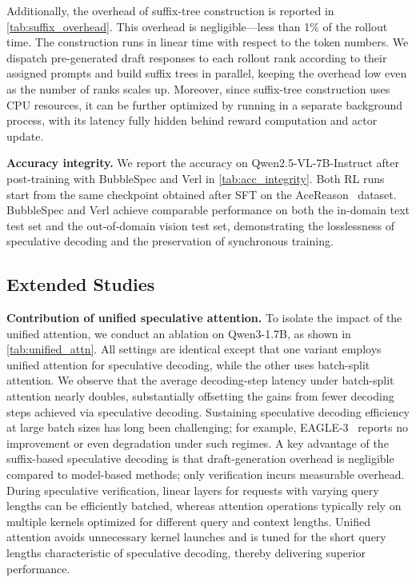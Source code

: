 Additionally, the overhead of suffix-tree construction is reported in \autoref{tab:suffix_overhead}. This overhead is negligible—less than 1\% of the rollout time. The construction runs in linear time with respect to the token numbers. We dispatch pre-generated draft responses to each rollout rank according to their assigned prompts and build suffix trees in parallel, keeping the overhead low even as the number of ranks scales up. Moreover, since suffix-tree construction uses CPU resources, it can be further optimized by running in a separate background process, with its latency fully hidden behind reward computation and actor update.



\textbf{Accuracy integrity.} We report the accuracy on Qwen2.5-VL-7B-Instruct after post-training with BubbleSpec and Verl in \autoref{tab:acc_integrity}. Both RL runs start from the same checkpoint obtained after SFT on the AceReason~\cite{liu2025acereason} dataset. BubbleSpec and Verl achieve comparable performance on both the in-domain text test set and the out-of-domain vision test set, demonstrating the losslessness of speculative decoding and the preservation of synchronous training.

\subsection{Extended Studies}


\textbf{Contribution of unified speculative attention.} To isolate the impact of the unified attention, we conduct an ablation on Qwen3-1.7B, as shown in \autoref{tab:unified_attn}. All settings are identical except that one variant employs unified attention for speculative decoding, while the other uses batch-split attention. We observe that the average decoding-step latency under batch-split attention nearly doubles, substantially offsetting the gains from fewer decoding steps achieved via speculative decoding. Sustaining speculative decoding efficiency at large batch sizes has long been challenging; for example, EAGLE-3~\cite{li2025eagle3} reports no improvement or even degradation under such regimes. A key advantage of the suffix-based speculative decoding is that draft-generation overhead is negligible compared to model-based methods; only verification incurs measurable overhead. During speculative verification, linear layers for requests with varying query lengths can be efficiently batched, whereas attention operations typically rely on multiple kernels optimized for different query and context lengths. Unified attention avoids unnecessary kernel launches and is tuned for the short query lengths characteristic of speculative decoding, thereby delivering superior performance.
 




